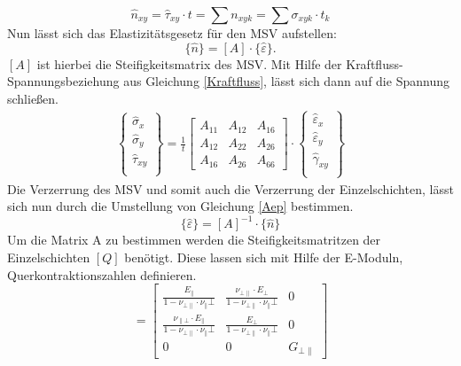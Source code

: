 \begin{equation}
\hat{n}_{xy}=\hat{\tau}_{xy}\cdot t=\sum n_{xyk}=\sum\sigma_{xyk}\cdot t_{k}
\end{equation}
Nun lässt sich das Elastizitätsgesetz für den MSV aufstellen:
\begin{equation}
\label{Aep}
\lbrace \hat{n}\rbrace= [A]\cdot \lbrace\hat{\varepsilon}\rbrace .
\end{equation}
$[A]$ ist hierbei die Steifigkeitsmatrix des MSV. Mit Hilfe der Kraftfluss- Spannungsbeziehung aus Gleichung \ref{Kraftfluss}, lässt sich dann auf die Spannung schließen.
\begin{gather}
\begin{Bmatrix}
\hat{\sigma}_{x}\\
\hat{\sigma}_{y}\\
\hat{\tau}_{xy}\\
\end{Bmatrix}
=
\frac{1}{t}
\begin{bmatrix}
A_{11}&A_{12}&A_{16}\\
A_{12}&A_{22}&A_{26}\\
A_{16}&A_{26}&A_{66}
\end{bmatrix}
\cdot
\begin{Bmatrix}
\hat{\varepsilon}_{x}\\
\hat{\varepsilon}_{y}\\
\hat{\gamma}_{xy}\\
\end{Bmatrix}
\end{gather}
\noindent
Die Verzerrung des MSV und somit auch die Verzerrung der Einzelschichten, lässt sich nun durch die Umstellung von Gleichung \ref{Aep} bestimmen.
\begin{equation}
\label{SpannungDehnung}
\lbrace\hat{\varepsilon}\rbrace = [A]^{-1}\cdot\lbrace \hat{n}\rbrace
\end{equation}
\noindent
Um die Matrix A zu bestimmen werden die Steifigkeitsmatritzen der Einzelschichten $[Q]$ benötigt. Diese lassen sich mit Hilfe der E-Moduln, Querkontraktionszahlen definieren.
\begin{equation}
[Q]
=
\begin{bmatrix}
\frac{E_{\|}}{1-\nu_{\bot\|}\cdot \nu_{\|}\bot}&\frac{\nu_{\bot\|}\cdot E_{\bot}}{1-\nu_{\bot\|}\cdot \nu_{\|}\bot}&0\\
\frac{\nu_{\|\bot}\cdot E_{\|}}{1-\nu_{\bot\|}\cdot \nu_{\|}\bot}&\frac{E_{\bot}}{1-\nu_{\bot\|}\cdot \nu_{\|}\bot}&0\\
0&0&G_{\bot\|}
\end{bmatrix}
\end{equation}
